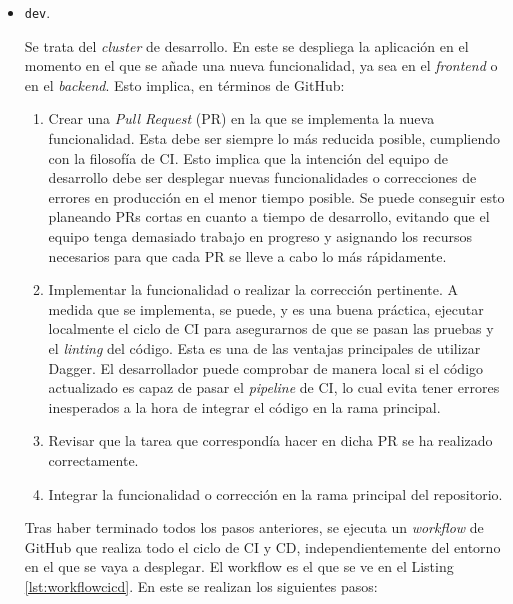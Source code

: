 \begin{itemize}
  \item \texttt{dev}.

    Se trata del \textit{cluster} de desarrollo. En este se despliega la aplicación en el momento en el que se añade una nueva funcionalidad, ya sea en el \textit{frontend} o en el \textit{backend}. Esto implica, en términos de GitHub:

    \begin{enumerate}
      \item Crear una \textit{Pull Request} (PR) en la que se implementa la nueva funcionalidad. Esta debe ser siempre lo más reducida posible, cumpliendo con la filosofía de CI. Esto implica que la intención del equipo de desarrollo debe ser desplegar nuevas funcionalidades o correcciones de errores en producción en el menor tiempo posible. Se puede conseguir esto planeando PRs cortas en cuanto a tiempo de desarrollo, evitando que el equipo tenga demasiado trabajo en progreso y asignando los recursos necesarios para que cada PR se lleve a cabo lo más rápidamente\cite{linear}.
      \item Implementar la funcionalidad o realizar la corrección pertinente. A medida que se implementa, se puede, y es una buena práctica, ejecutar localmente el ciclo de CI para asegurarnos de que se pasan las pruebas y el \textit{linting} del código. Esta es una de las ventajas principales de utilizar Dagger. El desarrollador puede comprobar de manera local si el código actualizado es capaz de pasar el \textit{pipeline} de CI, lo cual evita tener errores inesperados a la hora de integrar el código en la rama principal.
      \item Revisar que la tarea que correspondía hacer en dicha PR se ha realizado correctamente.
      \item Integrar la funcionalidad o corrección en la rama principal del repositorio.
    \end{enumerate}

    Tras haber terminado todos los pasos anteriores, se ejecuta un \textit{workflow} de GitHub que realiza todo el ciclo de CI y CD, independientemente del entorno en el que se vaya a desplegar. El workflow es el que se ve en el Listing \ref{lst:workflowcicd}. En este se realizan los siguientes pasos:


\end{itemize}
